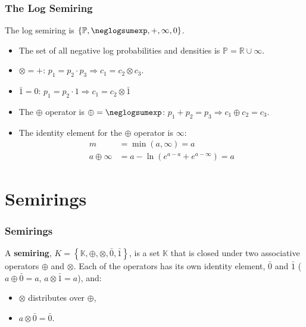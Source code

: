 \begin{frame}
  \frametitle{The Log Semiring}

  The log semiring is $\left\{\mathbb{P},\neglogsumexp,+,\infty,0\right\}$.
  \begin{itemize}
  \item The set of all negative log probabilities and densities is
    $\mathbb{P}=\mathbb{R}\cup\infty$.
  \item $\otimes=+$: $p_1=p_2\cdot p_3\Rightarrow c_1=c_2\otimes c_3$.
  \item $\bar{1}=0$: $p_1=p_2\cdot 1\Rightarrow c_1=c_2\otimes\bar{1}$
  \item The $\oplus$ operator is $\oplus=\neglogsumexp$:
    $p_1+p_2=p_3 \Rightarrow c_1\oplus c_2 =c_3$.
  \item The identity element for the $\oplus$ operator is $\infty$:
    \begin{align*}
      m &= \min(a,\infty)  = a\\
      a\oplus \infty &= a -\ln\left(e^{a-a}+e^{a-\infty}\right) = a
    \end{align*}
  \end{itemize}
\end{frame}



\section[Semirings]{Semirings}
\setcounter{subsection}{1}

\begin{frame}
  \frametitle{Semirings}

  A {\bf semiring},
  $K=\left\{\mathbb{K},\oplus,\otimes,\bar{0},\bar{1}\right\}$, is a
  set $\mathbb{K}$ that is closed under two associative operators
  $\oplus$ and $\otimes$. Each of the operators has its own identity
  element, $\bar{0}$ and $\bar{1}$ ($a\oplus\bar{0}=a$,
  $a\otimes\bar{1}=a$), and:
  \begin{itemize}
  \item $\otimes$ distributes over $\oplus$,
  \item $a\otimes\bar{0}=\bar{0}$.
  \end{itemize}
\end{frame}

